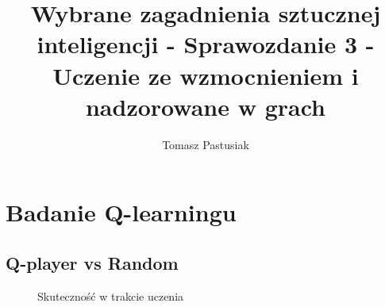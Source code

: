 \documentclass{article}
\title{Wybrane zagadnienia sztucznej inteligencji - Sprawozdanie 3 - Uczenie ze wzmocnieniem i nadzorowane w grach}
\author{Tomasz Pastusiak \And{Leszek Kawecki}}
\begin{document}

\maketitle


\section{Badanie Q-learningu}

\subsection{Q-player vs Random}

\begin{figure}[H]
  \centering
  \caption{Skuteczność w trakcie uczenia}
  \label{fig:L02G01_qlearning}
\end{figure}
\end{document}
